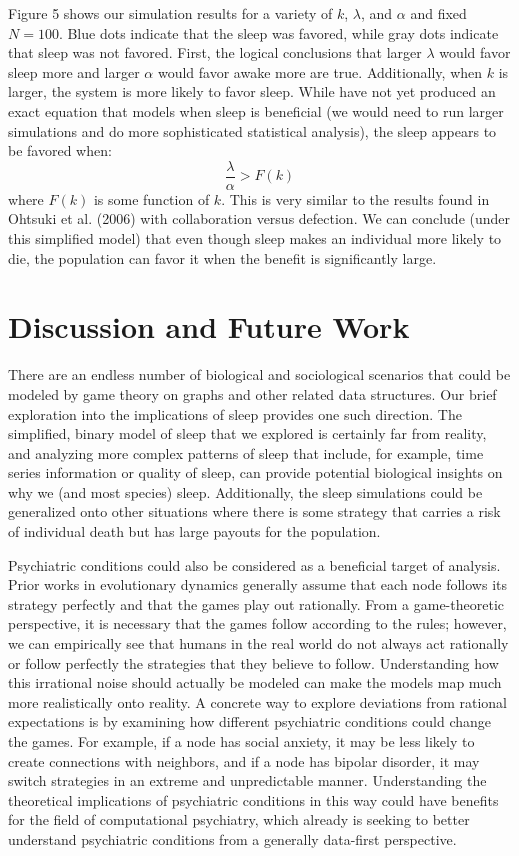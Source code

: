 \documentclass[11pt]{article}
\begin{document}
Figure 5 shows our simulation results for a variety of $k$, $\lambda$, and $\alpha$ and fixed $N = 100$. Blue dots indicate that the sleep was favored, while gray dots indicate that sleep was not favored. First, the logical conclusions that larger $\lambda$ would favor sleep more and larger $\alpha$ would favor awake more are true. Additionally, when $k$ is larger, the system is more likely to favor sleep. While have not yet produced an exact equation that models when sleep is beneficial (we would need to run larger simulations and do more sophisticated statistical analysis), the sleep appears to be favored when:
\begin{equation}
    \frac{\lambda}{\alpha} > F(k)
\end{equation}
where $F(k)$ is some function of $k$. This is very similar to the results found in Ohtsuki et al. (2006) with collaboration versus defection. We can conclude (under this simplified model) that even though sleep makes an individual more likely to die, the population can favor it when the benefit is significantly large. 

\section{Discussion and Future Work}
There are an endless number of biological and sociological scenarios that could be modeled by game theory on graphs and other related data structures. Our brief exploration into the implications of sleep provides one such direction. The simplified, binary model of sleep that we explored is certainly far from reality, and analyzing more complex patterns of sleep that include, for example, time series information or quality of sleep, can provide potential biological insights on why we (and most species) sleep. Additionally, the sleep simulations could be generalized onto other situations where there is some strategy that carries a risk of individual death but has large payouts for the population. 

Psychiatric conditions could also be considered as a beneficial target of analysis. Prior works in evolutionary dynamics generally assume that each node follows its strategy perfectly and that the games play out rationally. From a game-theoretic perspective, it is necessary that the games follow according to the rules; however, we can empirically see that humans in the real world do not always act rationally or follow perfectly the strategies that they believe to follow. Understanding how this irrational noise should actually be modeled can make the models map much more realistically onto reality. A concrete way to explore deviations from rational expectations is by examining how different psychiatric conditions could change the games. For example, if a node has social anxiety, it may be less likely to create connections with neighbors, and if a node has bipolar disorder, it may switch strategies in an extreme and unpredictable manner. Understanding the theoretical implications of psychiatric conditions in this way could have benefits for the field of computational psychiatry, which already is seeking to better understand psychiatric conditions from a generally data-first perspective. 
\end{document}
